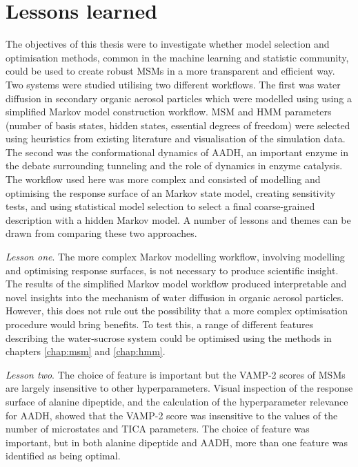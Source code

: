 \section{Lessons learned}

The objectives of this thesis were to investigate whether model selection and optimisation methods,  common in the machine learning and statistic community,  could be used to create robust MSMs in a more transparent and efficient way.  Two systems were studied utilising two different workflows. The first was water diffusion in secondary organic aerosol particles which were modelled using using a simplified Markov model construction workflow. MSM and HMM parameters (number of basis states, hidden states, essential degrees of freedom) were selected using heuristics from existing literature and visualisation of the simulation data. The second was the conformational dynamics of AADH, an important enzyme in the debate surrounding tunneling and the role of dynamics in enzyme catalysis.  The workflow used here was more complex and consisted of modelling and optimising the response surface of an Markov state model, creating sensitivity tests, and using statistical model selection to select a final coarse-grained description with a hidden Markov model.  A number of lessons and themes can be drawn from comparing these two approaches. 

\emph{Lesson one}. The more complex Markov modelling workflow, involving modelling and optimising response surfaces, is not necessary to produce scientific insight. The results of the simplified Markov model workflow produced interpretable and novel insights into the mechanism of water diffusion in organic aerosol particles. However, this does not rule out the possibility that a more complex optimisation procedure would bring benefits. To test this, a range of different features describing the water-sucrose system could be optimised using the methods in chapters \ref{chap:msm} and  \ref{chap:hmm}.  

\emph{Lesson two}. The choice of feature is important but the VAMP-2 scores of MSMs are largely insensitive to other hyperparameters.  Visual inspection of the response surface of alanine dipeptide, and the calculation of the hyperparameter relevance for AADH, showed that the VAMP-2 score was insensitive to the values of the number of microstates and TICA parameters. The choice of feature was important, but in both alanine dipeptide and AADH, more than one feature was identified as being  optimal.  

